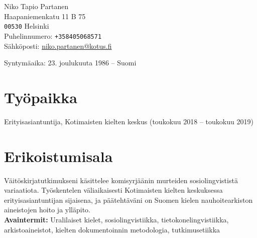 \documentclass[11pt, a4paper]{article}
\begin{document}

{\LARGE Niko Tapio Partanen}\\[1cm] %
Haapaniemenkatu 11 B 75\\
\texttt{00530} Helsinki\\[.2cm]
Puhelinnumero: \texttt{+358405068571}\\ %
Sähköposti: \href{mailto:niko.partanen@kotus.fi}{niko.partanen@kotus.fi}\\ %

\vspace{10mm}

Syntymäaika: 23. joulukuuta 1986 – Suomi\\ %


\section*{Työpaikka}

Erityisasiantuntija, Kotimaisten kielten keskus (toukokuu 2018 – toukokuu 2019) %

\section*{Erikoistumisala}

Väitöskirjatutkimukseni käsittelee komisyrjäänin murteiden sosiolingvististä variaatiota. Työskentelen väliaikaisesti Kotimaisten kielten keskuksessa erityisasiantuntijan sijaisena, ja päätehtäväni on Suomen kielen nauhoitearkiston aineistojen hoito ja ylläpito.\\

\textbf{Avaintermit:} Uralilaiset kielet, sosiolingvistiikka, tietokonelingvistiikka, arkistoaineistot, kielten dokumentoinnin metodologia, tutkimusetiikka %

\end{document}
